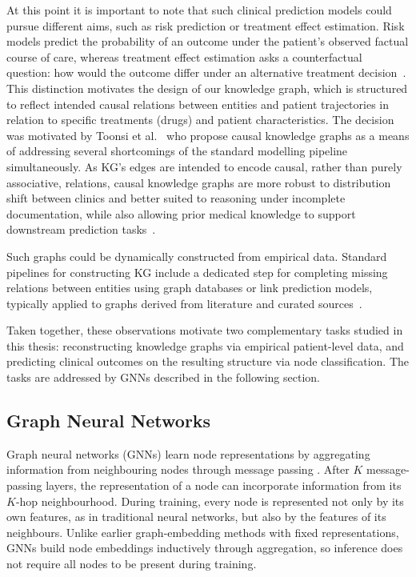 At this point it is important to note that such clinical prediction models
could pursue different aims, such as risk prediction or treatment effect estimation. 
Risk models
predict the probability of an outcome under the patient's observed
factual course of care, whereas treatment effect estimation asks a
counterfactual question: how would the outcome differ under an
alternative treatment decision~\cite{hoogland2021tutorial}. This distinction motivates
 the design of our knowledge graph, which is structured to reflect 
 intended causal relations between entities and patient trajectories in 
 relation to specific treatments (drugs) and patient characteristics.
The decision was motivated by Toonsi et al.~\cite{toonsi2025causal} who propose
causal
knowledge graphs as a means of addressing several shortcomings of the
standard modelling pipeline simultaneously. 
As KG's edges are
intended to encode causal, rather than purely associative, relations,
causal knowledge graphs are more robust to distribution
shift between clinics and better suited to reasoning under incomplete
documentation, while also allowing prior medical knowledge to support
downstream prediction tasks~\cite{cui2025hkgreview}. 

Such graphs could be dynamically constructed from empirical data.
Standard pipelines for constructing KG include a dedicated
step for completing missing relations between entities using graph
databases or link prediction models, typically applied to graphs
derived from literature and curated sources~\cite{cui2025hkgreview}. 


Taken together, these observations motivate two complementary tasks
studied in this thesis: reconstructing
knowledge graphs via empirical patient-level data, and predicting clinical outcomes
on the resulting structure via node classification. The
tasks are addressed by GNNs described in the following section.

\subsection{Graph Neural Networks}
\label{subsec:related-gnn}

Graph neural networks (GNNs) learn node representations by aggregating
information from neighbouring nodes through message passing
\cite{hamilton2017graphsage}.
After $K$ message-passing layers, the representation of a node can
incorporate information from its $K$-hop neighbourhood.
During training, every node is represented not only by its own features, as
in traditional neural networks, but also by the features of its neighbours.
Unlike earlier graph-embedding methods with fixed representations, GNNs
build node embeddings inductively through aggregation, so inference does not
require all nodes to be present during training.

